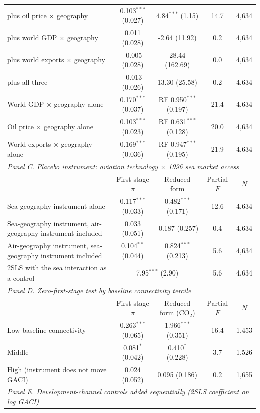 \begin{table}[htbp]
\begin{threeparttable}
\begin{tabular}{lcccc}
  \quad plus oil price $\times$ geography & 0.103$^{***}$ (0.027) & 4.84$^{***}$ (1.15) & 14.7 & 4,634 \\
  \quad plus world GDP $\times$ geography & 0.011 (0.028) & -2.64 (11.92) & 0.2 & 4,634 \\
  \quad plus world exports $\times$ geography & -0.005 (0.028) & 28.44 (162.69) & 0.0 & 4,634 \\
  \quad plus all three & -0.013 (0.026) & 13.30 (25.58) & 0.2 & 4,634 \\
  World GDP $\times$ geography alone & 0.170$^{***}$ (0.037) & RF 0.950$^{***}$ (0.197) & 21.4 & 4,634 \\
  Oil price $\times$ geography alone & 0.103$^{***}$ (0.023) & RF 0.631$^{***}$ (0.128) & 20.0 & 4,634 \\
  World exports $\times$ geography alone & 0.169$^{***}$ (0.036) & RF 0.947$^{***}$ (0.195) & 21.9 & 4,634 \\
\midrule
\multicolumn{5}{l}{\textit{Panel C. Placebo instrument: aviation technology $\times$ 1996 sea market access}} \\
 & First-stage $\pi$ & Reduced form & Partial $F$ & $N$ \\
  Sea-geography instrument alone & 0.117$^{***}$ (0.033) & 0.482$^{***}$ (0.171) & 12.6 & 4,634 \\
  Sea-geography instrument, air-geography instrument included & 0.033 (0.051) & -0.187 (0.257) & 0.4 & 4,634 \\
  Air-geography instrument, sea-geography instrument included & 0.104$^{**}$ (0.044) & 0.824$^{***}$ (0.213) & 5.6 & 4,634 \\
  \quad 2SLS with the sea interaction as a control & \multicolumn{2}{c}{7.95$^{***}$ (2.90)} & 5.6 & 4,634 \\
\midrule
\multicolumn{5}{l}{\textit{Panel D. Zero-first-stage test by baseline connectivity tercile}} \\
 & First-stage $\pi$ & Reduced form (CO$_2$) & Partial $F$ & $N$ \\
  Low baseline connectivity & 0.263$^{***}$ (0.065) & 1.966$^{***}$ (0.351) & 16.4 & 1,453 \\
  Middle & 0.081$^{*}$ (0.042) & 0.410$^{*}$ (0.228) & 3.7 & 1,526 \\
  High (instrument does not move GACI) & 0.024 (0.052) & 0.095 (0.186) & 0.2 & 1,655 \\
\midrule
\multicolumn{5}{l}{\textit{Panel E. Development-channel controls added sequentially (2SLS coefficient on log GACI)}} \\

\end{tabular}
\end{threeparttable}
\end{table}
